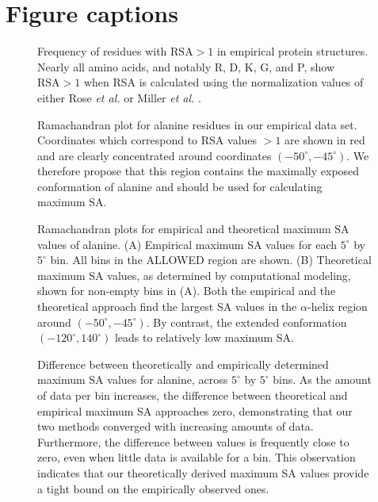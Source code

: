 \documentclass[11pt]{article}
\begin{document}



\newpage

\section*{Figure captions}

\begin{figure}[H]
\caption{\label{fig:BarGraphRSA}Frequency of residues with $\text{RSA}>1$ in empirical protein structures. Nearly all amino acids, and notably R, D, K, G, and P, show $\text{RSA}>1$ 
when RSA is calculated using the normalization values of either Rose \emph{et al.} \cite{Rose1985} or Miller \emph{et al.} \cite{Miller1987}.}
\end{figure}

\begin{figure}[H]
\caption{\label{fig:RamaAla}Ramachandran plot for alanine residues in our empirical data set. Coordinates which correspond to RSA values $>1$ are shown in red and are clearly concentrated around coordinates $(-50^\circ,-45^\circ)$. We therefore propose that this region contains the maximally exposed conformation of alanine and should be used for calculating maximum SA.}
\end{figure}

\begin{figure}[H]
\caption{\label{fig:heatrama} Ramachandran plots for empirical and theoretical maximum SA values of alanine. (A) Empirical maximum SA values for each $5^\circ$ by $5^\circ$ bin. All bins in the ALLOWED region are shown. (B) Theoretical maximum SA values, as determined by computational modeling, shown for non-empty bins in (A). Both the empirical and the theoretical approach find the largest SA values in the $\alpha$-helix region around $(-50^\circ,-45^\circ)$. By contrast, the extended conformation $(-120^\circ, 140^\circ)$ leads to relatively low maximum SA.}
\end{figure}


\begin{figure}[H]
\caption{\label{fig:EvC} Difference between theoretically and empirically determined maximum SA values for alanine, across $5^\circ$ by $5^\circ$ bins. As the amount of data per bin increases, the difference between theoretical and empirical maximum SA approaches zero, demonstrating that our two methods converged with increasing amounts of data. Furthermore, the difference between values is frequently close to zero, even when little data is available for a bin. This observation indicates that our theoretically derived maximum SA values provide a tight bound on the empirically observed ones.}
\end{figure}
\end{document}
